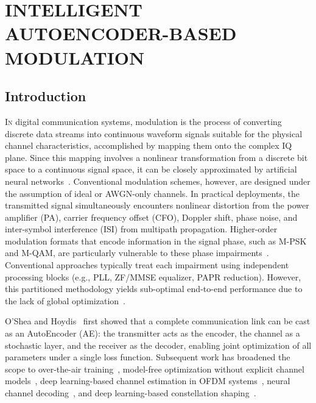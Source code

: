 \documentclass[a4paper,14pt]{extreport}
\begin{document}
\chapter{INTELLIGENT AUTOENCODER-BASED MODULATION}

\section{Introduction}

\lettrine[lines=2, loversize=0.15, findent=0.1em]{I}{n} digital communication systems, modulation is the process of converting discrete data streams into continuous waveform signals suitable for the physical channel characteristics, accomplished by mapping them onto the complex IQ plane. Since this mapping involves a nonlinear transformation from a discrete bit space to a continuous signal space, it can be closely approximated by artificial neural networks~\cite{hornik1991}. Conventional modulation schemes, however, are designed under the assumption of ideal or AWGN-only channels. In practical deployments, the transmitted signal simultaneously encounters nonlinear distortion from the power amplifier (PA), carrier frequency offset (CFO), Doppler shift, phase noise, and inter-symbol interference (ISI) from multipath propagation. Higher-order modulation formats that encode information in the signal phase, such as M-PSK and M-QAM, are particularly vulnerable to these phase impairments~\cite{proakis2008}. Conventional approaches typically treat each impairment using independent processing blocks (e.g., PLL, ZF/MMSE equalizer, PAPR reduction). However, this partitioned methodology yields sub-optimal end-to-end performance due to the lack of global optimization~\cite{oshea2017}.

O'Shea and Hoydis~\cite{oshea2017} first showed that a complete communication link can be cast as an AutoEncoder (AE): the transmitter acts as the encoder, the channel as a stochastic layer, and the receiver as the decoder, enabling joint optimization of all parameters under a single loss function. Subsequent work has broadened the scope to over-the-air training~\cite{dorner2018}, model-free optimization without explicit channel models~\cite{aoudia2019}, deep learning-based channel estimation in OFDM systems~\cite{ye2018}, neural channel decoding~\cite{gruber2017}, and deep learning-based constellation shaping~\cite{stark2019}.
\end{document}

